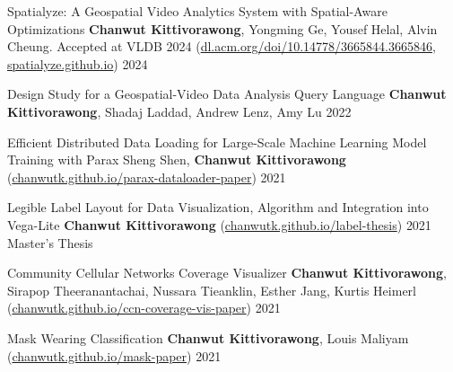 

\begin{cvpubs}

  \cvpub
    {Spatialyze: A Geospatial Video Analytics System with Spatial-Aware Optimizations} %
    {\textbf{Chanwut Kittivorawong}, Yongming Ge, Yousef Helal, Alvin Cheung. Accepted at VLDB 2024 (\href{https://dl.acm.org/doi/10.14778/3665844.3665846}{dl.acm.org/doi/10.14778/3665844.3665846}, \href{https://spatialyze.github.io}{spatialyze.github.io})} %
    {2024} %
    {} %
    
  \cvpub
    {Design Study for a Geospatial-Video Data Analysis Query Language} %
    {\textbf{Chanwut Kittivorawong}, Shadaj Laddad, Andrew Lenz, Amy Lu} %
    {2022} %
    {} %

  \cvpub
    {Efficient Distributed Data Loading for Large-Scale Machine Learning Model Training with Parax} %
    {Sheng Shen, \textbf{Chanwut Kittivorawong} (\href{https://chanwutk.github.io/parax-dataloader-paper}{chanwutk.github.io/parax-dataloader-paper})} %
    {2021} %
    {} %

  \cvpub
    {Legible Label Layout for Data Visualization, Algorithm and Integration into Vega-Lite} %
    {\textbf{Chanwut Kittivorawong} (\href{https://chanwutk.github.io/label-thesis}{chanwutk.github.io/label-thesis})} %
    {2021} %
    {Master's Thesis} %

  \cvpub
    {Community Cellular Networks Coverage Visualizer} %
    {\textbf{Chanwut Kittivorawong}, Sirapop Theeranantachai, Nussara Tieanklin, Esther Jang, Kurtis Heimerl (\href{https://chanwutk.github.io/ccn-coverage-vis-paper}{chanwutk.github.io/ccn-coverage-vis-paper})} %
    {2021} %
    {} %

  \cvpub
    {Mask Wearing Classification} %
    {\textbf{Chanwut Kittivorawong}, Louis Maliyam (\href{https://chanwutk.github.io/mask-paper}{chanwutk.github.io/mask-paper})} %
    {2021} %
    {} %


\end{cvpubs}
